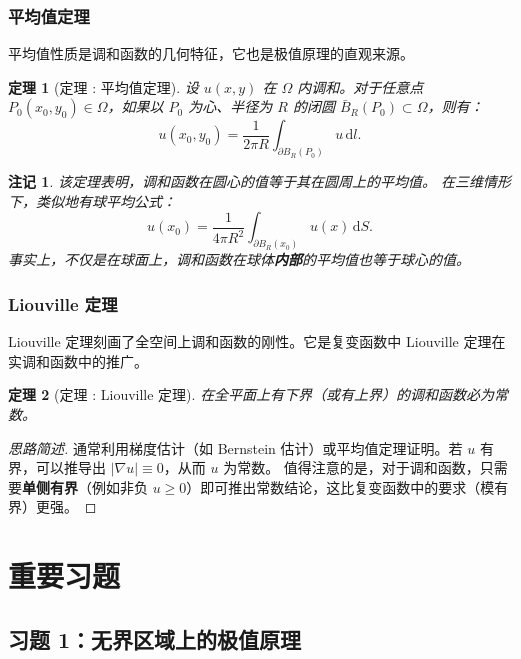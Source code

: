 \documentclass[12pt,a4paper]{ctexart}
\newtheorem*{note}{注记}
\newtheorem{theorem}{定理}[section]
\begin{document}
	\subsubsection{平均值定理}
	
	平均值性质是调和函数的几何特征，它也是极值原理的直观来源。
	
	\begin{theorem}[定理 : 平均值定理]
		设 $u(x,y)$ 在 $\Omega$ 内调和。对于任意点 $P_0(x_0, y_0) \in \Omega$，如果以 $P_0$ 为心、半径为 $R$ 的闭圆 $\bar{B}_R(P_0) \subset \Omega$，则有：
		\begin{equation}
			u(x_0, y_0) = \frac{1}{2\pi R} \int_{\partial B_R(P_0)} u \, \mathrm{d}l.
		\end{equation}
	\end{theorem}
	
	\begin{note}
		该定理表明，调和函数在圆心的值等于其在圆周上的平均值。
		在三维情形下，类似地有球平均公式：
		\[
		u(x_0) = \frac{1}{4\pi R^2} \int_{\partial B_R(x_0)} u(x) \, \mathrm{d}S.
		\]
		事实上，不仅是在球面上，调和函数在球体\textbf{内部}的平均值也等于球心的值。
	\end{note}
	
	\subsubsection{Liouville 定理}
	
	Liouville 定理刻画了全空间上调和函数的刚性。它是复变函数中 Liouville 定理在实调和函数中的推广。
	
	\begin{theorem}[定理 : Liouville 定理]
		在全平面上有下界（或有上界）的调和函数必为常数。
	\end{theorem}
	
	\begin{proof}[思路简述]
		通常利用梯度估计（如 Bernstein 估计）或平均值定理证明。若 $u$ 有界，可以推导出 $|\nabla u| \equiv 0$，从而 $u$ 为常数。
		值得注意的是，对于调和函数，只需要\textbf{单侧有界}（例如非负 $u \ge 0$）即可推出常数结论，这比复变函数中的要求（模有界）更强。
	\end{proof}
	
	\section{重要习题}
	
	\subsection*{习题 1：无界区域上的极值原理}
	
\end{document}
